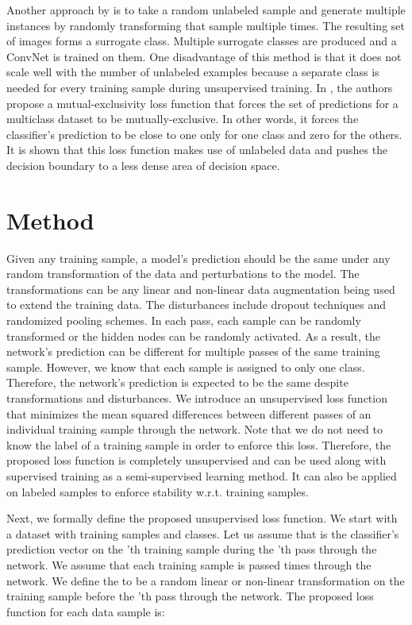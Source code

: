 \documentclass{article}
\begin{document}
Another approach by \cite{dosovitskiy2014discriminative} is to take a random unlabeled sample and generate multiple instances by randomly transforming that sample multiple times. The resulting set of images forms a surrogate class. Multiple surrogate classes are produced and a ConvNet is trained on them. One disadvantage of this method is that it does not scale well with the number of unlabeled examples because a separate class is needed for every training sample during unsupervised training.
In \cite{mutualexclusive}, the authors propose a mutual-exclusivity loss function that forces the set of predictions for a multiclass dataset to be mutually-exclusive. In other words, it forces the classifier's prediction to be close to one only for one class and zero for the others. It is shown that this loss function makes use of unlabeled data and pushes the decision boundary to a less dense area of decision space.
\vspace{-0.2cm}
\section{Method}
\vspace{-0.1cm}
Given any training sample, a model's prediction should be the same under any random transformation of the data and perturbations to the model. The transformations can be any linear and non-linear data augmentation being used to extend the training data. The disturbances include dropout techniques and randomized pooling schemes. In each pass, each sample can be randomly transformed or the hidden nodes can be randomly activated. As a result, the network's prediction can be different for multiple passes of the same training sample. However, we know that each sample is assigned to only one class. Therefore, the network's prediction is expected to be the same despite transformations and disturbances. We introduce an unsupervised loss function that minimizes the mean squared differences between different passes of an individual training sample through the network. Note that we do not need to know the label of a training sample in order to enforce this loss. Therefore, the proposed loss function is completely unsupervised and can be used along with supervised training as a semi-supervised learning method. It can also be applied on labeled samples to enforce stability w.r.t. training samples. 

Next, we formally define the proposed unsupervised loss function. We start with a dataset with  training samples and  classes. Let us assume that  is the classifier's prediction vector on the 'th training sample during the 'th pass through the network. We assume that each training sample is passed  times through the network. We define the  to be a random linear or non-linear transformation on the training sample  before the 'th pass through the network. The proposed loss function for each data sample is:
\end{document}
